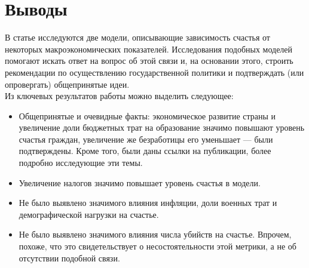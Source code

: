 \documentclass[russian]{vegareport}
\begin{document}
    
    \chapter{Выводы}
        В статье исследуются две модели, описывающие зависимость счастья от некоторых макроэкономических показателей. Исследования подобных моделей помогают искать ответ на вопрос об этой связи и, на основании этого, строить рекомендации по осуществлению государственной политики и подтверждать (или опровергать) общепринятые идеи.
        \\
        Из ключевых результатов работы можно выделить следующее:
        \begin{itemize}
            \item Общепринятые и очевидные факты: экономическое развитие страны и увеличение доли бюджетных трат на образование значимо повышают уровень счастья граждан, увеличение же безработицы его уменьшает --- были подтверждены. Кроме того, были даны ссылки на публикации, более подробно исследующие эти темы.
            \item Увеличение налогов значимо повышает уровень счастья в модели.
            \item Не было выявлено значимого влияния инфляции, доли военных трат и демографической нагрузки на счастье.
            \item Не было выявлено значимого влияния числа убийств на счастье. Впрочем, похоже, что это свидетельствует о несостоятельности этой метрики, а не об отсутствии подобной связи.
        \end{itemize}
        
\end{document}
